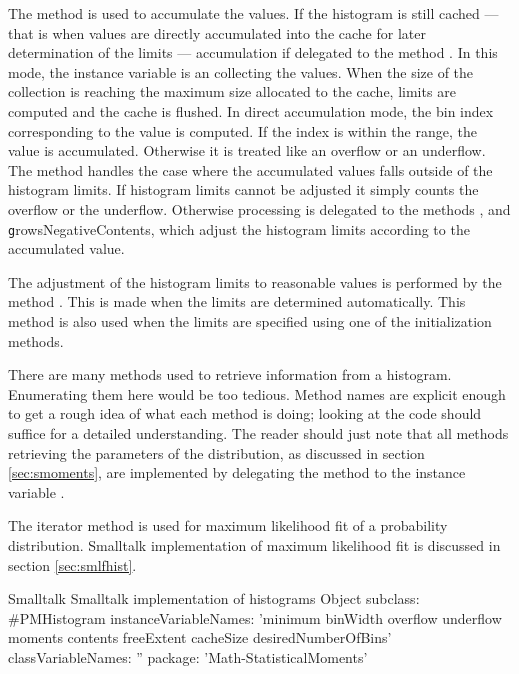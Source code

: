 The method  is used to accumulate the values. If
the histogram is still cached --- that is when values are directly
accumulated into the cache for later determination of the limits
--- accumulation if delegated to the method .
In this mode, the instance variable  is an  collecting the values.
When the size of the collection is reaching the maximum size allocated to the cache, limits are computed and the cache is flushed. In direct accumulation mode, the bin index corresponding to the value is computed.
If the index is within the range, the
value is accumulated. Otherwise it is treated like an overflow or
an underflow. The method  handles the
case where the accumulated values falls outside of the histogram
limits. If histogram limits cannot be adjusted it simply counts
the overflow or the underflow. Otherwise processing is delegated
to the methods , 
and {\texttt growsNegativeContents}, which adjust the histogram limits
according to the accumulated value.

The adjustment of the histogram limits to reasonable values is
performed by the method . This is made
when the limits are determined automatically. This method is also
used when the limits are specified using one of the initialization
methods.

There are many methods used to retrieve information from a
histogram. Enumerating them here would be too tedious. Method
names are explicit enough to get a rough idea of what each method
is doing; looking at the code should suffice for a detailed
understanding. The reader should just note that all methods
retrieving the parameters of the distribution, as discussed in
section \ref{sec:smoments}, are implemented by delegating the
method to the instance variable .

The iterator method  is used for maximum
likelihood fit of a probability distribution. Smalltalk
implementation of maximum likelihood fit is discussed in section
\ref{sec:smlfhist}.

\begin{listing}[label=lst:histogram]{Smalltalk}
  {Smalltalk implementation of histograms}
Object subclass: #PMHistogram
   instanceVariableNames: 'minimum binWidth overflow underflow moments contents freeExtent cacheSize desiredNumberOfBins'
   classVariableNames: ''
   package: 'Math-StatisticalMoments'
\end{listing}


